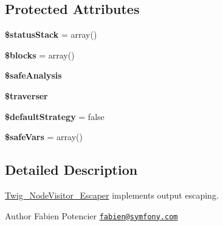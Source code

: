\subsection*{Protected Attributes}
\begin{DoxyCompactItemize}
\item 
\hypertarget{class_twig___node_visitor___escaper_a5188483cd1e2d2c6609d2a642e72c44a}{}{\bfseries \$status\+Stack} = array()\label{class_twig___node_visitor___escaper_a5188483cd1e2d2c6609d2a642e72c44a}

\item 
\hypertarget{class_twig___node_visitor___escaper_a320aeae1df42ee73ab4b3d9f7cf4ef3f}{}{\bfseries \$blocks} = array()\label{class_twig___node_visitor___escaper_a320aeae1df42ee73ab4b3d9f7cf4ef3f}

\item 
\hypertarget{class_twig___node_visitor___escaper_aa0090a6a2f00fcb39fa723d6a79b53cb}{}{\bfseries \$safe\+Analysis}\label{class_twig___node_visitor___escaper_aa0090a6a2f00fcb39fa723d6a79b53cb}

\item 
\hypertarget{class_twig___node_visitor___escaper_ae6725770c4bf11723bd3586bc0699c82}{}{\bfseries \$traverser}\label{class_twig___node_visitor___escaper_ae6725770c4bf11723bd3586bc0699c82}

\item 
\hypertarget{class_twig___node_visitor___escaper_add8b7fa48484c8d41707819868a0b32f}{}{\bfseries \$default\+Strategy} = false\label{class_twig___node_visitor___escaper_add8b7fa48484c8d41707819868a0b32f}

\item 
\hypertarget{class_twig___node_visitor___escaper_ac4491da07b27e3c0f9b37962428e567c}{}{\bfseries \$safe\+Vars} = array()\label{class_twig___node_visitor___escaper_ac4491da07b27e3c0f9b37962428e567c}

\end{DoxyCompactItemize}


\subsection{Detailed Description}
\hyperlink{class_twig___node_visitor___escaper}{Twig\+\_\+\+Node\+Visitor\+\_\+\+Escaper} implements output escaping.

\begin{DoxyAuthor}{Author}
Fabien Potencier \href{mailto:fabien@symfony.com}{\tt fabien@symfony.\+com} 
\end{DoxyAuthor}


